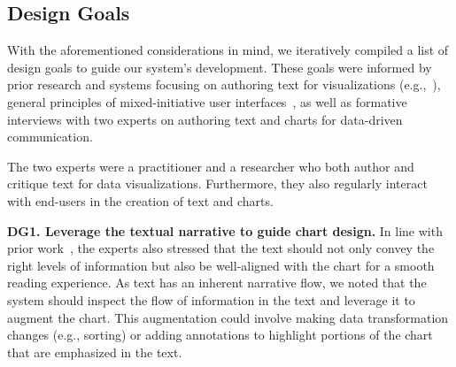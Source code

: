 \subsection{Design Goals}
\label{sec:design-goals}

With the aforementioned considerations in mind, we iteratively compiled a list of design goals to guide our system's development.
These goals were informed by prior research and systems focusing on authoring text for visualizations (e.g.,~\cite{kim2023emphasischecker,latif2021kori,liu2023autotitle,he2024leveraging,tang2023vistext,singh2024figura11y}), general principles of mixed-initiative user interfaces~\cite{horvitz1999}, as well as formative interviews with two experts on authoring text and charts for data-driven communication.

The two experts were a practitioner and a researcher who both author and critique text for data visualizations. 
Furthermore, they also regularly interact with end-users in the creation of text and charts.

\vspace{.5em}
\noindent\textbf{DG1. Leverage the textual narrative to guide chart design.}
In line with prior work~\cite{stokes2022striking,ottley2019curious,kim2021towards}, the experts also stressed that the text should not only convey the right levels of information but also be well-aligned with the chart for a smooth reading experience.
As text has an inherent narrative flow, we noted that the system should  inspect the flow of information in the text and leverage it to augment the chart.
This augmentation could involve making data transformation changes (e.g., sorting) or adding annotations to highlight portions of the chart that are emphasized in the text.

